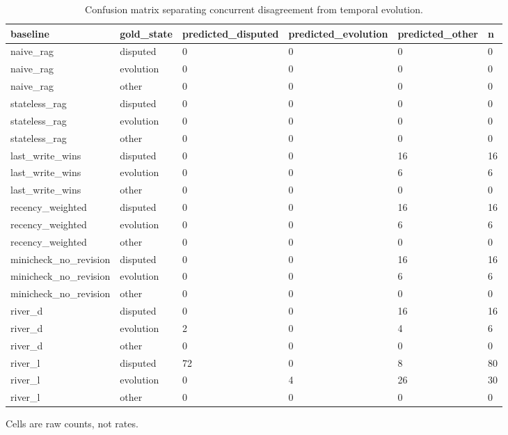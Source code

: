 \begin{table}
\centering
\caption{Confusion matrix separating concurrent disagreement from temporal evolution.}
\begin{tabular}{llllll}
baseline & gold\_state & predicted\_disputed & predicted\_evolution & predicted\_other & n \\ \hline
naive\_rag & disputed & 0 & 0 & 0 & 0 \\
naive\_rag & evolution & 0 & 0 & 0 & 0 \\
naive\_rag & other & 0 & 0 & 0 & 0 \\
stateless\_rag & disputed & 0 & 0 & 0 & 0 \\
stateless\_rag & evolution & 0 & 0 & 0 & 0 \\
stateless\_rag & other & 0 & 0 & 0 & 0 \\
last\_write\_wins & disputed & 0 & 0 & 16 & 16 \\
last\_write\_wins & evolution & 0 & 0 & 6 & 6 \\
last\_write\_wins & other & 0 & 0 & 0 & 0 \\
recency\_weighted & disputed & 0 & 0 & 16 & 16 \\
recency\_weighted & evolution & 0 & 0 & 6 & 6 \\
recency\_weighted & other & 0 & 0 & 0 & 0 \\
minicheck\_no\_revision & disputed & 0 & 0 & 16 & 16 \\
minicheck\_no\_revision & evolution & 0 & 0 & 6 & 6 \\
minicheck\_no\_revision & other & 0 & 0 & 0 & 0 \\
river\_d & disputed & 0 & 0 & 16 & 16 \\
river\_d & evolution & 2 & 0 & 4 & 6 \\
river\_d & other & 0 & 0 & 0 & 0 \\
river\_l & disputed & 72 & 0 & 8 & 80 \\
river\_l & evolution & 0 & 4 & 26 & 30 \\
river\_l & other & 0 & 0 & 0 & 0 \\
\end{tabular}
\footnotesize{Cells are raw counts, not rates.}
\end{table}

